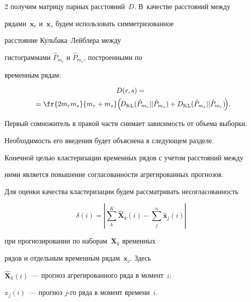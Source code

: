 \begin{multicols}{2}
 получим матрицу парных расстояний~$D$. В~качестве расстояний между

 рядами~$\mathbf{x}_r$ и~$\mathbf{x}_s$ будем использовать симметризованное

 расстояние Куль\-ба\-ка--Лейб\-ле\-ра между

 гистограммами $\hat{P}_{m_r}$ и $\hat{P}_{m_s}$, построенными по

 временн$\acute{\mbox{ы}}$м рядам:

   \begin{multline}

   \label{eq:matKLdist}

   D(r, s) = {}\\

\hspace*{-1.5mm}{}=\fr{2m_rm_s}{m_r + m_s}\!\left(\!D_{\KL}(\hat{P}_{m_r}||\hat{P}_{m_s}) +

   D_{\KL}(\hat{P}_{m_s}||\hat{P}_{m_r})\!\right)\!.\!\!\!\!

   \end{multline}

  Первый сомножитель в правой части снимает зависимость от объема выборки.

  Необходимость его введения будет объяснена  в следующем разделе.



Конечной целью кластеризации временн$\acute{\mbox{ы}}$х рядов с учетом расстояний между

ними является повыше\-ние согласованности агрегированных прогнозов.

Для оценки качества кластеризации будем рассматривать несогласованность

\begin{equation}

\label{eq:inconsistency}

\delta(i) = \left|\sum\limits_k^{K} \mathbf{\hat{X}}_k(i) -

\sum\limits_j^{n} \mathbf{\hat{x}}_j(i) \right|

\end{equation}

 при прогнозировании  по наборам~$\mathbf{X}_k$ временн$\acute{\mbox{ы}}$х

 рядов и отдельным временн$\acute{\mbox{ы}}$м рядам~$\mathbf{x}_j$. Здесь

 $\hat{\mathbf{X}}_k(i)$~--- прогноз агрегированного ряда в момент~$i$;

 $\hat{x}_j(i)$~--- прогноз $j$-го ряда в момент времени~$i$.


\end{multicols}
